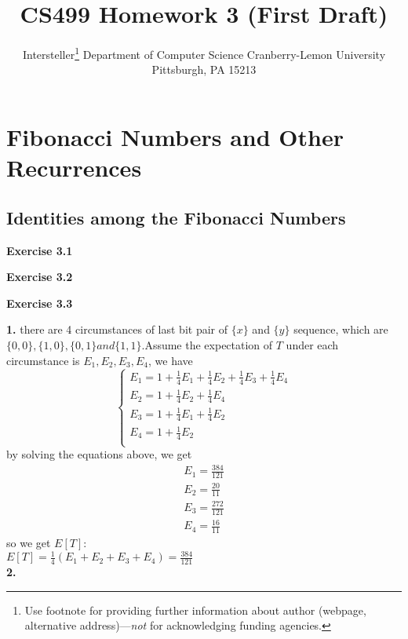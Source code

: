 \documentclass{article} %
\title{CS499 Homework 3 (First Draft)}
\author{
	Intersteller\thanks{ Use footnote for providing further information
		about author (webpage, alternative address)---\emph{not} for acknowledging
		funding agencies.}
	Department of Computer Science
	Cranberry-Lemon University
	Pittsburgh, PA 15213
}
\begin{document}
	
	
	\maketitle
	
	\section{Fibonacci Numbers and Other Recurrences}
	\subsection{Identities among the Fibonacci Numbers}
	 \textbf{Exercise 3.1}\par
	


	\textbf{Exercise 3.2}\par
	
	\textbf{Exercise 3.3}\par
	
	\textbf{ 1.} there are 4 circumstances of last bit pair of $\{x\}$ and $\{y\}$ sequence, which are $\{0,0\},\{1,0\},\{0,1\} and \{1,1\}$.Assume the expectation of $T$ under each circumstance is $E_1,E_2,E_3,E_4$, we have
    $$
        \begin{cases}
        E_1=1+\frac{1}{4}E_1+\frac{1}{4}E_2+\frac{1}{4}E_3+\frac{1}{4}E_4\\
        E_2=1+\frac{1}{4}E_2+\frac{1}{4}E_4\\
        E_3=1+\frac{1}{4}E_1+\frac{1}{4}E_2\\
        E_4=1+\frac{1}{4}E_2\\
        \end{cases}
    $$
	by solving the equations above, we get
	\begin{equation*}
	\begin{split}
	E_1=\frac{384}{121}\\
	E_2=\frac{20}{11}\\
	E_3=\frac{272}{121}\\
	E_4=\frac{16}{11}
	\end{split}
	\end{equation*}
	so we get $E[T]$:\\
	$E[T]=\frac{1}{4}(E_1+E_2+E_3+E_4) = \frac{384}{121} $\\
	\textbf{ 2.}
	
\end{document}
